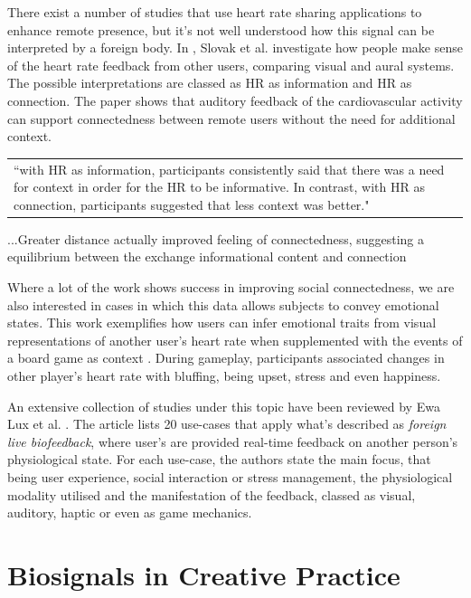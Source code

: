 There exist a number of studies that use heart rate sharing applications to enhance remote presence, but it's not well understood how this signal can be interpreted by a foreign body. In \cite{slovak_understanding_2012}, Slovak et al. investigate how people make sense of the heart rate feedback from other users, comparing visual and aural systems. The possible interpretations are classed as HR as information and HR as connection. The paper shows that auditory feedback of the cardiovascular activity can support connectedness between remote users without the need for additional context.  

\begin{center}
\begin{tabular}{|p{13cm}}
“with HR as information, participants consistently said that there was a need for context in order for the HR to be informative.  In contrast, with HR as connection, participants suggested that less context was better." 
\end{tabular}
\end{center}

...Greater distance actually improved feeling of connectedness, suggesting a equilibrium between the exchange informational content and connection 

Where a lot of the work shows success in improving social connectedness, we are also interested in cases in which this data allows subjects to convey emotional states. This work exemplifies how users can infer emotional traits from visual representations of another user's heart rate when supplemented with the events of a board game as context \cite{frey_remote_2016}. During gameplay, participants associated changes in other player's heart rate with bluffing, being upset, stress and even happiness. 

An extensive collection of studies under this topic have been reviewed by Ewa Lux et al. \cite{lux_live_2018}. The article lists 20 use-cases that apply what's described as \textit{foreign live biofeedback}, where user's are provided real-time feedback on another person's physiological state. For each use-case, the authors state the main focus, that being user experience, social interaction or stress management, the physiological modality utilised and the manifestation of the feedback, classed as visual, auditory, haptic or even as game mechanics.  

\section{Biosignals in Creative Practice}
\label{lit_review:biosignals_creativity}

